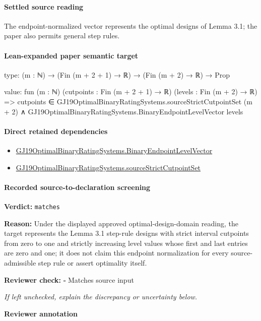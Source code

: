 \documentclass[10pt]{article}
\newcommand{\reviewerbox}{%
  \par\noindent\fbox{\parbox{0.96\linewidth}{\rule{0pt}{0.38in}}}\par
}
\newcommand{\reviewmatch}[1]{%
  \par\noindent\textbf{Reviewer check:} $\square$\; #1\par
  \noindent\emph{If left unchecked, explain the discrepancy or uncertainty below.}\par
}
\begin{document}
\paragraph{Settled source reading}
\begin{sloppypar}
The endpoint-\allowbreak{}normalized vector represents the optimal designs of Lemma 3.\allowbreak{}1;\allowbreak{} the paper also permits general step rules.\allowbreak{}
\end{sloppypar}

\paragraph{Lean-expanded paper semantic target}
\begin{ReviewVerbatim}
type:
(m : ℕ) → (Fin (m + 2 + 1) → ℝ) → (Fin (m + 2) → ℝ) → Prop

value:
fun (m : ℕ) (cutpoints : Fin (m + 2 + 1) → ℝ) (levels : Fin (m + 2) → ℝ) =>
  cutpoints ∈ GJ19OptimalBinaryRatingSystems.sourceStrictCutpointSet (m + 2) ∧
    GJ19OptimalBinaryRatingSystems.BinaryEndpointLevelVector levels
\end{ReviewVerbatim}

\paragraph{Direct retained dependencies}
\begin{itemize}\raggedright
\item \hyperlink{governing-declaration-aa797f827cdcda67}{GJ19\allowbreak{}Optimal\allowbreak{}Binary\allowbreak{}Rating\allowbreak{}Systems.\allowbreak{}Binary\allowbreak{}Endpoint\allowbreak{}Level\allowbreak{}Vector}
\item \hyperlink{governing-declaration-6da4e9f9d3af34a1}{GJ19\allowbreak{}Optimal\allowbreak{}Binary\allowbreak{}Rating\allowbreak{}Systems.\allowbreak{}source\allowbreak{}Strict\allowbreak{}Cutpoint\allowbreak{}Set}
\end{itemize}
\paragraph{Recorded source-to-declaration screening}
\textbf{Verdict:} \texttt{matches}
\\
{\raggedright
\textbf{Reason:} Under the displayed approved optimal-\allowbreak{}design-\allowbreak{}domain reading, the target represents the Lemma 3.\allowbreak{}1 step-\allowbreak{}rule designs with strict interval cutpoints from zero to one and strictly increasing level values whose first and last entries are zero and one;\allowbreak{} it does not claim this endpoint normalization for every source-\allowbreak{}admissible step rule or assert optimality itself.\allowbreak{}
\par}
\reviewmatch{Matches source input}
\noindent\textbf{Reviewer annotation}\par
\reviewerbox
\clearpage
\hypertarget{paper-prerequisite-b848ff2e7e41e74f}{}
\end{document}
